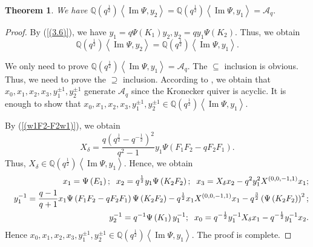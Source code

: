 \documentclass[reqno,11pt]{amsart}
\numberwithin{equation}{section}
\newtheorem{theorem}{Theorem}[section]
\begin{document}
 \begin{theorem}\label{3.8}
 		We have $\mathbb{Q}(q^{\frac{1}{2}})\left\langle\operatorname{Im} \Psi, y_2\right\rangle=\mathbb{Q}(q^{\frac{1}{2}})\left\langle\operatorname{Im} \Psi, y_1\right\rangle=\mathcal{A}_q .$
\end{theorem}
\begin{proof}
	By (\ref{(3.6)}), we have $y_1=q \Psi\left(K_1\right) y_2, y_2=q y_1 \Psi\left(K_2\right)$. Thus, we obtain
$$\mathbb{Q}(q^{\frac{1}{2}})\left\langle\operatorname{Im} \Psi, y_2\right\rangle=\mathbb{Q}(q^{\frac{1}{2}})\left\langle\operatorname{Im} \Psi, y_1\right\rangle .
$$

We only need to prove $\mathbb{Q}(q^{\frac{1}{2}})\left\langle\operatorname{Im} \Psi, y_1\right\rangle=\mathcal{A}_q$. The $\subseteq$ inclusion is obvious. Thus, we need to prove the $\supseteq$ inclusion.  According to  \cite{AA}, we obtain that $x_0, x_1, x_2, x_3, y_1^{ \pm 1}, y_2^{ \pm 1}$ generate $\mathcal{A}_q$ since the Kronecker quiver is acyclic. It is enough to show that $ x_0, x_1, x_2, x_3, y_1^{ \pm 1}, y_2^{ \pm 1} \in \mathbb{Q}(q^{\frac{1}{2}})\left\langle\operatorname{Im} \Psi, y_1\right\rangle$.

By (\ref{(w1F2-F2w1)}), we obtain
$$X_\delta=\frac{q\left(q^{\frac{1}{2}}-q^{-\frac{1}{2}}\right)^2}{q^2-1} y_1 \Psi\left(F_1 F_2-q F_2 F_1\right) .
$$
Thus, $X_\delta \in \mathbb{Q}(q^{\frac{1}{2}})\left\langle\operatorname{Im} \Psi, y_1\right\rangle$.
Hence, we obtain
\begingroup
{}
\begin{eqnarray*}
	&&x_1 =\Psi\left(E_1\right);\hspace{0.2cm}
	x_2=q^{\frac{1}{2}} y_1 \Psi\left(K_2 F_2\right);\hspace{0.2cm} 	
    x_3 = {X_\delta }{x_2} - {q^2}y_1^2{X^{(0,0, - 1,1)}}{x_1}; \\
	&&y_1^{-1}  ={\frac{q-1}{q+1}} x_1 \Psi\left(F_1 F_2-q F_2 F_1\right) \Psi\left(K_2 F_2\right)-q^{\frac{1}{2}} x_1 X^{(0,0,-1,1)} x_1-q^{\frac{3}{2}}\left(\Psi\left(K_2 F_2\right)\right)^2; \\
	&&y_2^{-1}  =q^{-1} \Psi\left(K_1\right) y_1^{-1};\hspace{0.2cm}
	x_0  =q^{-\frac{1}{2}} y_1^{-1} X_\delta x_1-q^{-\frac{1}{2}} y_1^{-1} x_2.
	\end{eqnarray*}
\endgroup
Hence $ x_0, x_1, x_2, x_3,y_1^{ \pm 1}, y_2^{ \pm 1} \in \mathbb{Q}(q^{\frac{1}{2}})\left\langle\operatorname{Im} \Psi, y_1\right\rangle.$ The proof is complete.
\end{proof}
\end{document}
